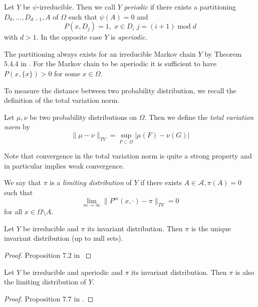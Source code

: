\begin{definition} Let $Y$ be $\psi$-irreducible. Then we call $Y$ \textit{periodic} if there exists a partitioning $D_0,\dots,D_{d-1},A$ of $\Omega$ such that $\psi(A)=0$ and 
$$P(x,D_{j}) = 1, \; x\in D_i\; j=(i+1)\; \mathrm{mod} \;d$$
with $d>1$. In the opposite case $Y$ is \textit{aperiodic}.
\end{definition}
The partitioning always exists for an irreducible Markov chain $Y$ by Theorem $5.4.4$ in \cite{MeynTweedie1993}. For the Markov chain to be aperiodic it is sufficient to have $P(x,\{x\})>0$ for some $x \in \Omega$.



To measure the distance between two probability distribution, we recall the definition of the total variation norm.
\begin{definition} 
Let $\mu,\nu$ be two probability distributions on $\Omega$. Then we define the \textit{total variation norm} by 
$$\| \mu -\nu\|_{TV} = \sup_{F \subset \Omega} |\mu(F) - \nu(G)|$$
\end{definition}
Note that convergence in the total variation norm is quite a strong property and in particular implies weak convergence.


\begin{definition} We say that $\pi$ is a \textit{limiting distribution} of $Y$ if there exists $A\in\mathcal A, \pi(A)=0$ such that
$$\lim_{m\to \infty} \|P^m(x,\cdot) - \pi\|_{TV} = 0$$
for all $x \in \Omega \setminus A$.
\end{definition}



\begin{proposition}\label{prop:MC1} Let $Y$ be irreducible and $\pi$ its invariant distribution. Then $\pi$ is the unique invariant distribution (up to null sets).
\end{proposition}
\begin{proof}
Proposition $7.2$ in \cite{MollerWaagepetersen2003}
\end{proof}

\begin{proposition}\label{prop:MC2} Let $Y$ be irreducible  and aperiodic and $\pi$ its invariant distribution. Then $\pi$ is also the limiting distribution of $Y$. 
\end{proposition}
\begin{proof}
Proposition $7.7$ in \cite{MollerWaagepetersen2003}.
\end{proof}



